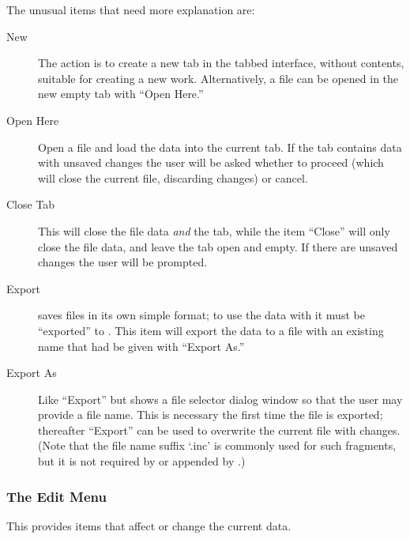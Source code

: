 			The unusual items that need more explanation are:
			\begin{description}
			  \item[New] The action is to create a new tab in the
			  tabbed interface, without contents, suitable for
			  creating a new work. Alternatively, a file can be opened
			  in the new empty tab with ``Open Here.''
			  \item[Open Here] Open a file and load the data into
			  the current tab. If the tab contains data with
			  unsaved changes the user will be asked whether to
			  proceed (which will close the current file,
			  discarding changes) or cancel.
			  \item[Close Tab] This will close the file data
			  \emph{and} the tab, while the item ``Close''
			  will only close the file data, and leave the tab
			  open and empty. If there are unsaved changes the
			  user will be prompted.
			  \item[Export] \IXpkgu{} saves files in its own
			  simple format; to use the data with \IXpov{}
			  it must be ``exported'' to . This item
			  will export the data to a file with an existing
			  name that had be given with ``Export As.''
			  \item[Export As] Like ``Export'' but shows a file
			  selector dialog window so that the user may provide
			  a file name. This is necessary the first time the
			  file is exported; thereafter ``Export'' can be used
			  to overwrite the current file with changes. (Note that
			  the file name suffix `.inc' is commonly used for
			  such  fragments, but it is not required by
			  \IXpov{} or appended by \IXpkg.)
			\end{description}

			\subsubsection{The Edit Menu}%
			This  provides items that
			affect or change the current data.

